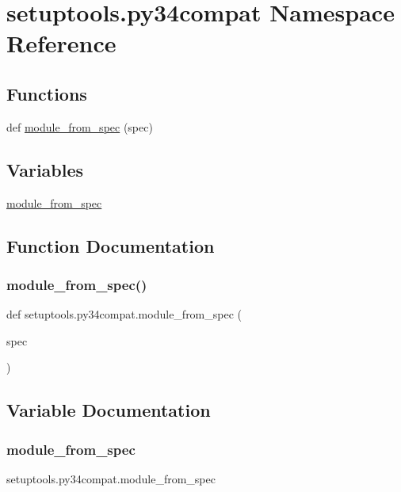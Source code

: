 \hypertarget{namespacesetuptools_1_1py34compat}{}\section{setuptools.\+py34compat Namespace Reference}
\label{namespacesetuptools_1_1py34compat}
\subsection*{Functions}
\begin{DoxyCompactItemize}
\item 
def \hyperlink{namespacesetuptools_1_1py34compat_ac17bdb7401c064ef8a6b440b0611045b}{module\+\_\+from\+\_\+spec} (spec)
\end{DoxyCompactItemize}
\subsection*{Variables}
\begin{DoxyCompactItemize}
\item 
\hyperlink{namespacesetuptools_1_1py34compat_a6a3b8a492e8382b18f3a04e41bda9687}{module\+\_\+from\+\_\+spec}
\end{DoxyCompactItemize}


\subsection{Function Documentation}
\mbox{\label{namespacesetuptools_1_1py34compat_ac17bdb7401c064ef8a6b440b0611045b}} 
\subsubsection{\texorpdfstring{module\+\_\+from\+\_\+spec()}{module\_from\_spec()}}
{\footnotesize\ttfamily def setuptools.\+py34compat.\+module\+\_\+from\+\_\+spec (\begin{DoxyParamCaption}\item[{}]{spec }\end{DoxyParamCaption})}



\subsection{Variable Documentation}
\mbox{\label{namespacesetuptools_1_1py34compat_a6a3b8a492e8382b18f3a04e41bda9687}} 
\subsubsection{\texorpdfstring{module\+\_\+from\+\_\+spec}{module\_from\_spec}}
{\footnotesize\ttfamily setuptools.\+py34compat.\+module\+\_\+from\+\_\+spec}


